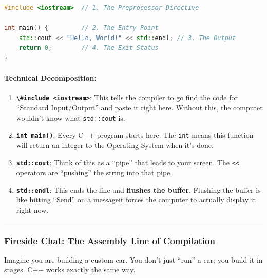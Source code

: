 \begin{lstlisting}[language={C++}]
#include <iostream>  // 1. The Preprocessor Directive

int main() {         // 2. The Entry Point
    std::cout << "Hello, World!" << std::endl; // 3. The Output
    return 0;        // 4. The Exit Status
}
\end{lstlisting}

\hypertarget{technical-decomposition}{%
\paragraph{Technical Decomposition:}\label{technical-decomposition}}

\begin{enumerate}
\def\labelenumi{\arabic{enumi}.}
\tightlist
\item
  \textbf{\passthrough{\lstinline!\#include <iostream>!}}: This tells
  the compiler to go find the code for ``Standard Input/Output'' and
  paste it right here. Without this, the computer wouldn't know what
  \passthrough{\lstinline!std::cout!} is.
\item
  \textbf{\passthrough{\lstinline!int main()!}}: Every C++ program
  starts here. The \passthrough{\lstinline!int!} means this function
  will return an integer to the Operating System when it's done.
\item
  \textbf{\passthrough{\lstinline!std::cout!}}: Think of this as a
  ``pipe'' that leads to your screen. The \passthrough{\lstinline!<<!}
  operators are ``pushing'' the string into that pipe.
\item
  \textbf{\passthrough{\lstinline!std::endl!}}: This ends the line and
  \textbf{flushes the buffer}. Flushing the buffer is like hitting
  ``Send'' on a messageit forces the computer to actually display it
  right now.
\end{enumerate}

\begin{center}\rule{0.5\linewidth}{0.5pt}\end{center}

\hypertarget{fireside-chat-the-assembly-line-of-compilation}{%
\subsubsection{Fireside Chat: The Assembly Line of
Compilation}\label{fireside-chat-the-assembly-line-of-compilation}}

Imagine you are building a custom car. You don't just ``run'' a car; you
build it in stages. C++ works exactly the same way.

